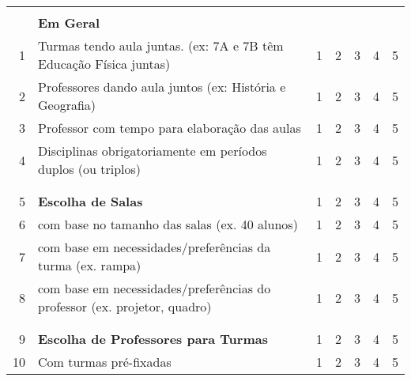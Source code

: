 \documentclass[12pt,a4paper]{article}
\def\numcirc#1{\large\textcircled{\small{#1}}}
\begin{document}
		\begin{center}

			\renewcommand{\arraystretch}{1.5}
			\footnotesize
			\begin{tabular}{ r l  c  c  c  c  c }
				& & \rotatebox{90}{ Inconveniente }
				& \rotatebox{90}{ Irrelevante }
				& \rotatebox{90}{ Neutro }
				& \rotatebox{90}{ Conveniente }
				& \rotatebox{90}{ Necessário }
				\\

				    & \textbf{Em Geral}																	&             &             &             &             &			  \\
				1   & Turmas tendo aula juntas. (ex: 7A e 7B têm Educação Física juntas)				& \numcirc{1} & \numcirc{2} & \numcirc{3} & \numcirc{4} & \numcirc{5} \\
				2   & Professores dando aula juntos (ex: História e Geografia)							& \numcirc{1} & \numcirc{2} & \numcirc{3} & \numcirc{4} & \numcirc{5} \\
				3   & Professor com tempo para elaboração das aulas				  						& \numcirc{1} & \numcirc{2} & \numcirc{3} & \numcirc{4} & \numcirc{5} \\
				4   & Disciplinas obrigatoriamente em períodos duplos (ou triplos) 						& \numcirc{1} & \numcirc{2} & \numcirc{3} & \numcirc{4} & \numcirc{5} \\
				\\\hline\\
				5	& \textbf{Escolha de Salas}													  		& \numcirc{1} & \numcirc{2} & \numcirc{3} & \numcirc{4} & \numcirc{5} \\
				6	& com base no tamanho das salas (ex. 40 alunos)		 								& \numcirc{1} & \numcirc{2} & \numcirc{3} & \numcirc{4} & \numcirc{5} \\
				7	& com base em necessidades/preferências da turma (ex. rampa)						& \numcirc{1} & \numcirc{2} & \numcirc{3} & \numcirc{4} & \numcirc{5} \\
				8	& com base em necessidades/preferências do professor (ex. projetor, quadro) 		& \numcirc{1} & \numcirc{2} & \numcirc{3} & \numcirc{4} & \numcirc{5} \\
				\\\hline\\
				9	& \textbf{Escolha de Professores para Turmas}										& \numcirc{1} & \numcirc{2} & \numcirc{3} & \numcirc{4} & \numcirc{5} \\
				10	& Com turmas pré-fixadas															& \numcirc{1} & \numcirc{2} & \numcirc{3} & \numcirc{4} & \numcirc{5} \\

\end{tabular}
\end{center}
\end{document}
